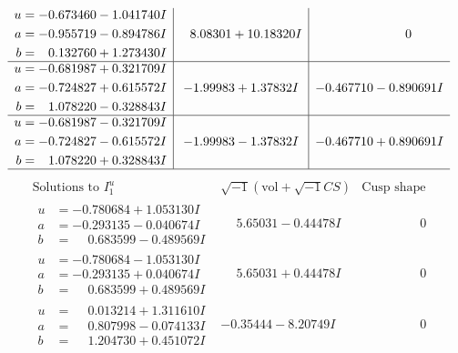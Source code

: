 \documentclass[1p]{elsarticle_modified}
\theoremstyle{definition}
\newcommand{\I}{\sqrt{-1}}
\begin{document}
$$\begin{array}{c|c|c}
\begin{aligned}
u &= -0.673460 - 1.041740 I \\
a &= -0.955719 - 0.894786 I \\
b &= \phantom{-}0.132760 + 1.273430 I\end{aligned}
 & \phantom{-}8.08301 + 10.18320 I & \phantom{-0.000000 } 0 \\ \hline\begin{aligned}
u &= -0.681987 + 0.321709 I \\
a &= -0.724827 + 0.615572 I \\
b &= \phantom{-}1.078220 - 0.328843 I\end{aligned}
 & -1.99983 + 1.37832 I & -0.467710 - 0.890691 I \\ \hline\begin{aligned}
u &= -0.681987 - 0.321709 I \\
a &= -0.724827 - 0.615572 I \\
b &= \phantom{-}1.078220 + 0.328843 I\end{aligned}
 & -1.99983 - 1.37832 I & -0.467710 + 0.890691 I\\
 \hline 
 \end{array}$$\newpage$$\begin{array}{c|c|c}  
\text{Solutions to }I^u_{1}& \I (\text{vol} + \sqrt{-1}CS) & \text{Cusp shape}\\
 \hline 
\begin{aligned}
u &= -0.780684 + 1.053130 I \\
a &= -0.293135 - 0.040674 I \\
b &= \phantom{-}0.683599 - 0.489569 I\end{aligned}
 & \phantom{-}5.65031 - 0.44478 I & \phantom{-0.000000 } 0 \\ \hline\begin{aligned}
u &= -0.780684 - 1.053130 I \\
a &= -0.293135 + 0.040674 I \\
b &= \phantom{-}0.683599 + 0.489569 I\end{aligned}
 & \phantom{-}5.65031 + 0.44478 I & \phantom{-0.000000 } 0 \\ \hline\begin{aligned}
u &= \phantom{-}0.013214 + 1.311610 I \\
a &= \phantom{-}0.807998 - 0.074133 I \\
b &= \phantom{-}1.204730 + 0.451072 I\end{aligned}
 & -0.35444 - 8.20749 I & \phantom{-0.000000 } 0 \\ \hline\begin{aligned}

\end{aligned}
\end{array}$$
\end{document}
